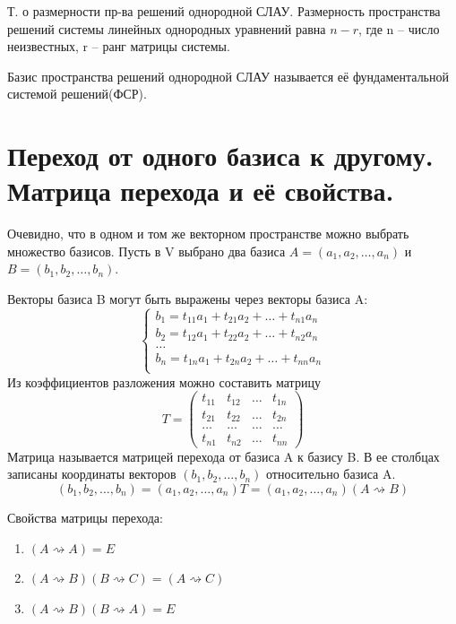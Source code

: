 \documentclass{article}
\begin{document}
\textsf{Т. о размерности пр-ва решений однородной СЛАУ.} Размерность пространства решений системы линейных однородных уравнений равна $n-r$, где n – число неизвестных, r – ранг матрицы системы.

Базис пространства решений однородной СЛАУ называется её фундаментальной системой решений(ФСР).

\section{Переход от одного базиса к другому. Матрица перехода и её свойства.}

Очевидно, что в одном и том же векторном пространстве можно выбрать множество базисов. Пусть в V выбрано два базиса $A=(a_1,a_2,\dots,a_n)$ и $B=(b_1,b_2,\dots,b_n)$.

Векторы базиса B могут быть выражены через векторы базиса A:
\begin{equation*}
    \begin{cases}
        b_1=t_{11}a_1+t_{21}a_2+\dots+t_{n1}a_n \\
        b_2=t_{12}a_1+t_{22}a_2+\dots+t_{n2}a_n \\
        \dots \\
        b_n=t_{1n}a_1+t_{2n}a_2+\dots+t_{nn}a_n \\
    \end{cases}
\end{equation*}
Из коэффициентов разложения можно составить матрицу $$T=
\begin{pmatrix}
    t_{11} & t_{12} & \dots & t_{1n} \\
    t_{21} & t_{22} & \dots & t_{2n} \\
    \dots & \dots & \dots & \dots \\
    t_{n1} & t_{n2} & \dots & t_{nn}
\end{pmatrix}
$$
Матрица называется \textsf{матрицей перехода} от базиса A к базису B. В ее столбцах записаны координаты векторов $(b_1,b_2,\dots,b_n)$ относительно базиса A.
$$(b_1,b_2,\dots,b_n)=(a_1,a_2,\dots,a_n)T=(a_1,a_2,\dots,a_n)(A\rightsquigarrow B)$$

Свойства матрицы перехода:
\begin{enumerate}
    \item $(A\rightsquigarrow A)=E$
    \item $(A\rightsquigarrow B)(B\rightsquigarrow C)=(A\rightsquigarrow C)$
    \item $(A\rightsquigarrow B)(B\rightsquigarrow A)=E$
\end{enumerate}
\end{document}
